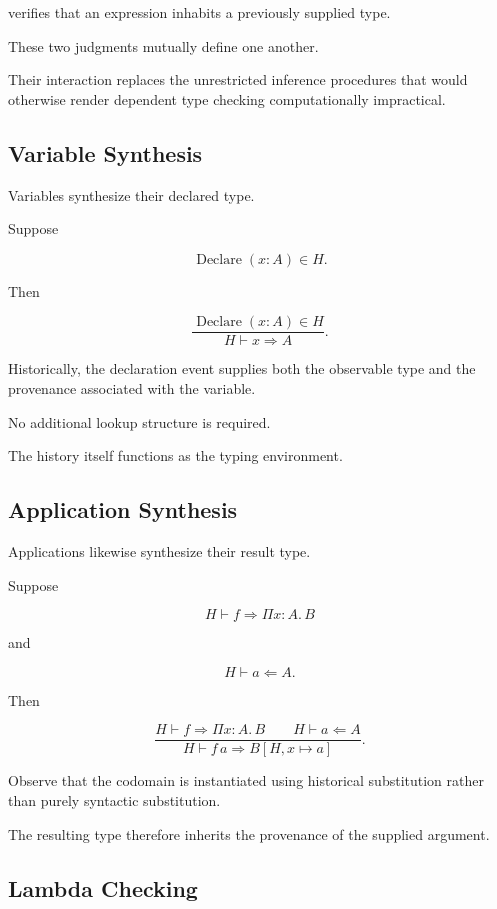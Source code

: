 \documentclass[12pt,oneside]{article}
\theoremstyle{definition}
\theoremstyle{remark}
\begin{document}
verifies that an expression inhabits a previously supplied type.

These two judgments mutually define one another.

Their interaction replaces the unrestricted inference procedures that would
otherwise render dependent type checking computationally impractical.

\subsection{Variable Synthesis}

Variables synthesize their declared type.

Suppose

\[
\operatorname{Declare}(x:A)
\in
H.
\]

Then

\[
\frac{
\operatorname{Declare}(x:A)\in H
}{
H
\vdash
x
\Rightarrow
A
}.
\]

Historically, the declaration event supplies both the observable type and the
provenance associated with the variable.

No additional lookup structure is required.

The history itself functions as the typing environment.

\subsection{Application Synthesis}

Applications likewise synthesize their result type.

Suppose

\[
H
\vdash
f
\Rightarrow
\Pi x:A.\,B
\]

and

\[
H
\vdash
a
\Leftarrow
A.
\]

Then

\[
\frac{
H
\vdash
f
\Rightarrow
\Pi x:A.\,B
\qquad
H
\vdash
a
\Leftarrow
A
}{
H
\vdash
f\,a
\Rightarrow
B[H,x\mapsto a]
}.
\]

Observe that the codomain is instantiated using historical substitution rather
than purely syntactic substitution.

The resulting type therefore inherits the provenance of the supplied argument.

\subsection{Lambda Checking}
\end{document}
